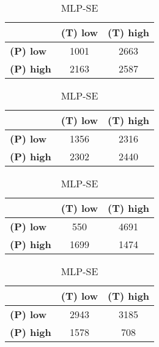 \begin{table}[htbp]
\centering
\begin{minipage}{.3\textwidth}
\tiny
\caption*{MLP-AP}
\begin{tabular}{|l|c|c|}
\hline
					& \textbf{(T) low}	& \textbf{(T) high}	\\ \hline
\textbf{(P) low}	& 1001				& 2663				\\ \hline
\textbf{(P) high}	& 2163				& 2587				\\ \hline
\end{tabular}
\end{minipage}\hfill
\begin{minipage}{.3\textwidth}
\tiny
\caption*{MLP-AT}
\begin{tabular}{|l|c|c|}
\hline
					& \textbf{(T) low}	& \textbf{(T) high}	\\ \hline
\textbf{(P) low}	& 1356				& 2316				\\ \hline
\textbf{(P) high}	& 2302				& 2440				\\ \hline
\end{tabular}
\end{minipage}\hfill
\begin{minipage}{.3\textwidth}
\tiny
\caption*{MLP-PL}
\begin{tabular}{|l|c|c|}
\hline
					& \textbf{(T) low}	& \textbf{(T) high}	\\ \hline
\textbf{(P) low}	& 550				& 4691				\\ \hline
\textbf{(P) high}	& 1699				& 1474				\\ \hline
\end{tabular}
\end{minipage}\hfill
\begin{minipage}{.3\textwidth}
\tiny
\caption*{MLP-SE}
\begin{tabular}{|l|c|c|}
\hline
					& \textbf{(T) low}	& \textbf{(T) high}	\\ \hline
\textbf{(P) low}	& 2943				& 3185				\\ \hline
\textbf{(P) high}	& 1578				& 708				\\ \hline
\end{tabular}
\end{minipage}\hfill
\end{table}
